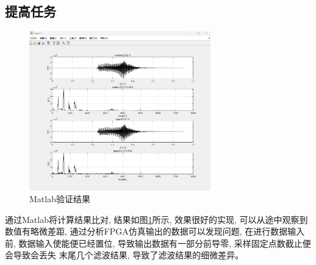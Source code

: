 \documentclass{article}
\begin{document}
\subsection*{提高任务}
\begin{figure}[H]
    \centering
    \includegraphics[width=0.7\textwidth]{image/2024-06-28-18-52-58.png}
    \caption{Matlab验证结果}
    \label{image_verify_improve_1}
\end{figure}
通过Matlab将计算结果比对, 结果如图\ref{image_verify_improve_1}所示, 效果很好的实现, 
可以从途中观察到数值有略微差距, 通过分析FPGA仿真输出的数据可以发现问题, 在进行数据输入
前, 数据输入使能便已经置位, 导致输出数据有一部分前导零, 采样固定点数截止便会导致会丢失
末尾几个滤波结果, 导致了滤波结果的细微差异。
\end{document}
